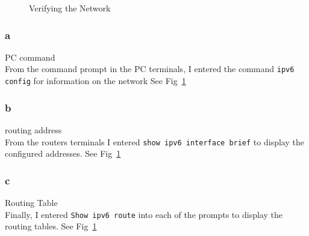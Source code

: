 \documentclass[../EngineeringJournal_CDavis.tex]{subfiles}
\begin{document}
\begin{figure}[!hbt]\centering
{}\par
{}\hfill 
{}
\caption{Verifying the Network}\label{IPv65ver}
\end{figure}

\subsubsection{a}{PC command}\\
From the command prompt in the PC terminals, I entered
the command {\scriptsize{\verb$ipv6 config$}\normalsize} for information on the network See
Fig~\ref{IPv65ver}

\subsubsection{b}{routing address}\\
From the routers terminals 
I entered {\scriptsize{\verb$show ipv6 interface brief$}\normalsize}  to display 
the configured addresses. See Fig~\ref{IPv65ver}

\subsubsection{c}{Routing Table}\\
Finally, I entered {\scriptsize{\verb$Show ipv6 route$}\normalsize} into each of the 
prompts to display the routing tables. See Fig~\ref{IPv65ver}
\end{document}

